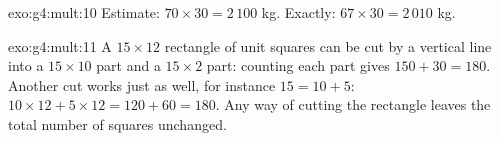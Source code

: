 \begin{solution}{exo:g4:mult:10}
Estimate: $70 \times 30 = 2\,100$ kg. Exactly:
$67 \times 30 = 2\,010$ kg.
\end{solution}

\begin{solution}{exo:g4:mult:11}
A $15 \times 12$ rectangle of unit squares can be cut by a vertical
line into a $15 \times 10$ part and a $15 \times 2$ part: counting
each part gives $150 + 30 = 180$. Another cut works just as well,
for instance $15 = 10 + 5$: $10 \times 12 + 5 \times 12 = 120 + 60
= 180$. Any way of cutting the rectangle leaves the total number of
squares unchanged.
\end{solution}
